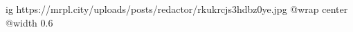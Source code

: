  
 
 
 
 

\ifcmt
  ig https://mrpl.city/uploads/posts/redactor/rkukrcjs3hdbz0ye.jpg
  @wrap center
  @width 0.6
\fi
